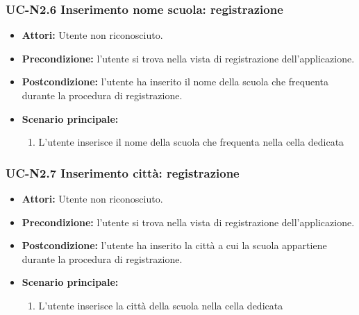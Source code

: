 \subsubsection{UC-N2.6 Inserimento nome scuola: registrazione}
\begin{itemize}
	\item \textbf{Attori: }Utente non riconosciuto.
	\item \textbf{Precondizione: }l'utente si trova nella vista di registrazione dell'applicazione.
	\item \textbf{Postcondizione: }l'utente ha inserito il nome della scuola che frequenta durante la procedura di registrazione.
	\item \textbf{Scenario principale: }
	\begin{enumerate}
		\item L'utente inserisce il nome della scuola che frequenta nella cella dedicata
	\end{enumerate}
\end{itemize}

\subsubsection{UC-N2.7 Inserimento città: registrazione}
\begin{itemize}
	\item \textbf{Attori: }Utente non riconosciuto.
	\item \textbf{Precondizione: }l'utente si trova nella vista 		di registrazione dell'applicazione.
	\item \textbf{Postcondizione: }l'utente ha inserito la città a cui la scuola appartiene durante la procedura di registrazione.
	\item \textbf{Scenario principale: }
	\begin{enumerate}
		\item L'utente inserisce la città della scuola nella cella dedicata
	\end{enumerate}
\end{itemize}

